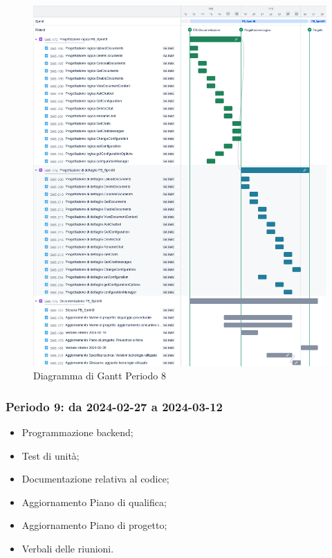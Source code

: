 \documentclass[10pt, a4paper]{article}
\begin{document}
\begin{figure}[H]
    \centering        
    \includegraphics[width=15.5cm]{gantt/ganttPeriodo8.png}
    \caption{Diagramma di Gantt Periodo 8}
\end{figure}


\subsubsection{Periodo 9: da 2024-02-27 a 2024-03-12}
%
\begin{itemize}
    \item Programmazione backend;
    \item Test di unità;
    \item Documentazione relativa al codice;
    \item Aggiornamento Piano di qualifica;
    \item Aggiornamento Piano di progetto;
    \item Verbali delle riunioni.
\end{itemize}
\end{document}
